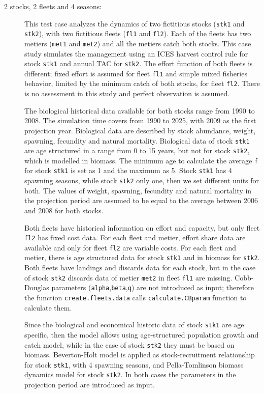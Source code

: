 \begin{description}
    \item[2 stocks, 2 fleets and 4 seasons:] This test case analyzes the dynamics of two fictitious stocks (\texttt{stk1} and \texttt{stk2}), with two fictitious fleets (\texttt{fl1} and \texttt{fl2}). Each of the fleets has two metiers (\texttt{met1} and \texttt{met2}) and all the metiers catch both stocks. This case study simulates the management using an ICES harvest control rule for stock \texttt{stk1} and annual TAC for \texttt{stk2}. The effort function of both fleets is different; fixed effort is assumed for fleet \texttt{fl1} and simple mixed fisheries behavior, limited by the minimum catch of both stocks, for fleet \texttt{fl2}. There is no assessment in this study and perfect observation is assumed.

The biological historical data available for both stocks range from 1990 to 2008. The simulation time covers from 1990 to 2025, with 2009 as the first projection year. Biological data are described by stock abundance, weight, spawning, fecundity and natural mortality. Biological data of stock \texttt{stk1} are age structured in a range from 0 to 15 years, but not for stock \texttt{stk2}, which is modelled in biomass. The minimum age to calculate the average \texttt{f} for stock \texttt{stk1} is set as 1 and the maximum as 5. Stock \texttt{stk1} has 4 spawning seasons, while stock \texttt{stk2} only one, then we set different units for both. The values of weight, spawning, fecundity and natural mortality in the projection period are assumed to be equal to the average between 2006 and 2008 for both stocks.

Both fleets have historical information on effort and capacity, but only fleet \texttt{fl2} has fixed cost data. For each fleet and metier, effort share data are available and only for fleet \texttt{fl2} are variable costs. For each fleet and metier, there is age structured data for stock \texttt{stk1} and in biomass for \texttt{stk2}. Both fleets have landings and discards data for each stock, but in the case of stock \texttt{stk2} discards data of metier \texttt{met2} in fleet \texttt{fl1} are missing. Cobb-Douglas parameters (\texttt{alpha},\texttt{beta},\texttt{q}) are not introduced as input; therefore the function \texttt{create.fleets.data} calls \texttt{calculate.CBparam} function to calculate them.

Since the biological and economical historic data of stock \texttt{stk1} are age specific, then the model allows using age-structured population growth and catch model, while in the case of stock \texttt{stk2} they must be based on biomass. Beverton-Holt model is applied as stock-recruitment relationship for stock \texttt{stk1}, with 4 spawning seasons, and Pella-Tomlinson biomass dynamics model for stock \texttt{stk2}. In both cases the parameters in the projection period are introduced as input.  
\end{description}

